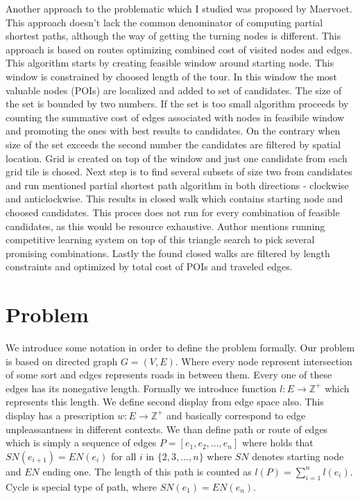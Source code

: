 \documentclass{ctuthesis}
\begin{document}
Another approach to the problematic which I studied was proposed by Maervoet\cite{oatsp}. This approach doesn't lack the common denominator of computing partial shortest paths, although the way of getting the turning nodes is different. This approach is based on routes optimizing combined cost of visited nodes and edges. This algorithm starts by creating feasible window around starting node. This window is constrained by choosed length of the tour. In this window the most valuable nodes (POIs) are localized and added to set of candidates. The size of the set is bounded by two numbers. If the set is too small algorithm proceeds by counting the summative cost of edges associated with nodes in feasibile window and promoting the ones with best results to candidates. On the contrary when size of the set exceeds the second number the candidates are filtered by spatial location. Grid is created on top of the window and just one candidate from each grid tile is chosed. Next step is to find several subsets of size two from candidates and run mentioned partial shortest path algorithm in both directions - clockwise and anticlockwise. This results in closed walk which contains starting node and choosed candidates. This proces does not run for every combination of feasible candidates, as this would be resource exhaustive. Author mentions running competitive learning system on top of this triangle search to pick several promising combinations. Lastly the found closed walks are filtered by length constraints and optimized by total cost of POIs and traveled edges.



\chapter{Problem}
We introduce some notation in order to define the problem formally. Our problem is based on directed graph \(G=(V, E)\). Where every node represent intersection of some sort and edges represents roads in between them. Every one of these edges has its nonegative length. Formally we introduce function \(l:E \rightarrow \mathbb{Z^+}\) which represents this length. We define second display from edge space also. This display has a prescription \(w:E \rightarrow \mathbb{Z^+}\) and basically correspond to edge unpleassantness in different contexts. We than define path or route of edges which is simply a sequence of edges \(P = [e_1, e_2, ..., e_n]\) where holds that \(SN(e_{i+1}) = EN(e_i) \) for all \(i\) in \(\{2, 3, ..., n\}\) where \(SN\) denotes starting node and \(EN\) ending one. The length of this path is counted as \(l(P)=\sum_{i=1}^{n}{l(e_i)}\). Cycle is special type of path, where \(SN(e_1) = EN(e_n)\).
\end{document}
